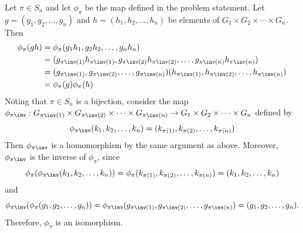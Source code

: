 \begin{sol}
    Let $\pi \in S_n$ and let $\phi_\pi$ be the map defined in the problem statement.
	Let $g = (g_1, g_2, \ldots, g_n)$ and $h = (h_1, h_2, \ldots, h_n)$ be elements of $G_1 \times G_2 \times \cdots \times G_n$.
	Then
    \begin{align*}
        \phi_\pi(gh) & = \phi_\pi(g_1h_1, g_2h_2, \ldots, g_nh_n) \\
        & = (g_{\pi\inv(1)}h_{\pi\inv(1)}, g_{\pi\inv(2)}h_{\pi\inv(2)}, \ldots, g_{\pi\inv(n)}h_{\pi\inv(n)}) \\
        & = (g_{\pi\inv(1)}, g_{\pi\inv(2)}, \ldots, g_{\pi\inv(n)})(h_{\pi\inv(1)}, h_{\pi\inv(2)}, \ldots, h_{\pi\inv(n)}) \\
        & = \phi_\pi(g)\phi_\pi(h)
    \end{align*}
    Noting that $\pi \in S_n$ is a bijection, consider the map $\phi_{\pi\inv} : G_{\pi\inv(1)} \times G_{\pi\inv(2)} \times \cdots \times G_{\pi\inv(n)} \to G_1 \times G_2 \times \cdots \times G_n$ defined by
    \[
    	\phi_{\pi\inv}(k_1, k_2, \ldots, k_n) = (k_{\pi(1)}, k_{\pi(2)}, \ldots, k_{\pi(n)})
    \]
    Then $\phi_{\pi\inv}$ is a homomorphism by the same argument as above.
	Moreover, $\phi_{\pi\inv}$ is the inverse of $\phi_\pi$, since
    \[
    	\phi_\pi(\phi_{\pi\inv}(k_1, k_2, \ldots, k_n)) = \phi_\pi(k_{\pi(1)}, k_{\pi(2)}, \ldots, k_{\pi(n)}) = (k_1, k_2, \ldots, k_n)
    \]
    and
    \[
    	\phi_{\pi\inv}(\phi_\pi(g_1, g_2, \ldots, g_n)) = \phi_{\pi\inv}(g_{\pi\inv(1)}, g_{\pi\inv(2)}, \ldots, g_{\pi\inv(n)}) = (g_1, g_2, \ldots, g_n).
    \]
    Therefore, $\phi_\pi$ is an isomorphism.
\end{sol}

